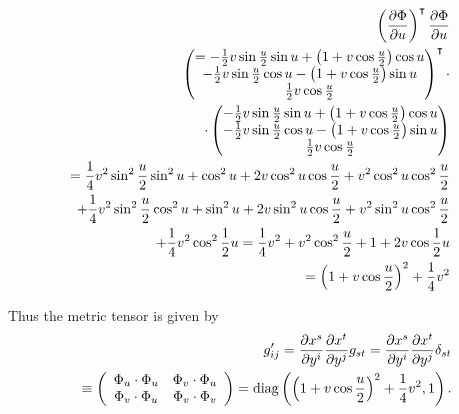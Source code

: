 {\begin{equation}
\begin{split}
\left(\frac{\partial \Phi }{\partial u}\right)^\intercal \frac{\partial \Phi }{\partial u}
\\
\begin{pmatrix}
= -\frac{1}{2}v\sin \frac{u}{2}\sin u+\left( 1+v\cos \frac{u}{2}\right) \cos
u \\
-\frac{1}{2}v\sin \frac{u}{2}\cos u-\left( 1+v\cos \frac{u}{2}\right) \sin
u \\
\frac{1}{2}v\cos \frac{u}{2}
\end{pmatrix}^\intercal     \cdot
\\
\cdot
\begin{pmatrix}
-\frac{1}{2}v\sin \frac{u}{2}\sin u+\left( 1+v\cos \frac{u}{2}\right) \cos
u \\
-\frac{1}{2}v\sin \frac{u}{2}\cos u-\left( 1+v\cos \frac{u}{2}\right) \sin
u \\
\frac{1}{2}v\cos \frac{u}{2}
\end{pmatrix}
 \\
=
\frac{1}{4}v^{2}\sin ^{2}\frac{u}{2}\sin ^{2}u+\cos
^{2}u+2 v \cos ^{2}u \cos \frac{u}{2}+
v^{2}\cos ^{2}u  \cos ^{2}\frac{u}{2}
\\
+\frac{1}{4}v^{2}\sin ^{2}\frac{u}{2}\cos^{2}u
+\sin ^{2}u+2  v\sin ^{2}u\cos \frac{u}{2}+ v^{2} \sin^{2}u\cos ^{2}\frac{u}{2}
 \\
+\frac{1}{4}v^{2}\cos ^{2}\frac{1}{2}%
u =\allowbreak \frac{1}{4}v^{2}+v^{2}\cos ^{2}\frac{u}{2}+1+2v\cos \frac{%
1}{2}u
 \\
=\left(1+v\cos \frac{u}{2}\right)^{2}+\frac{1}{4}v^{2}
\end{split}
\end{equation}


Thus the metric tensor is given by
\begin{equation}
\begin{split}
g'_{ij}
= {\partial {x}^s\over \partial { y }^i}{\partial {x}^t\over \partial { y }^j}g_{st}
= {\partial {x}^s\over \partial { y }^i}{\partial {x}^t\over \partial { y }^j}\delta_{st}\\
\quad \equiv
\left(
\begin{array}{cc}
\Phi _{u}\cdot \Phi _{u} & \Phi _{v}\cdot \Phi _{u} \\
\Phi _{v}\cdot \Phi _{u} & \Phi _{v}\cdot \Phi _{v}
\end{array}
\right) ={\rm diag}\left(
\left(1+v\cos \frac{u}{2}\right)^{2}+\frac{1}{4}v^{2} , 1\right).
\end{split}
\end{equation}

\eexample
}






